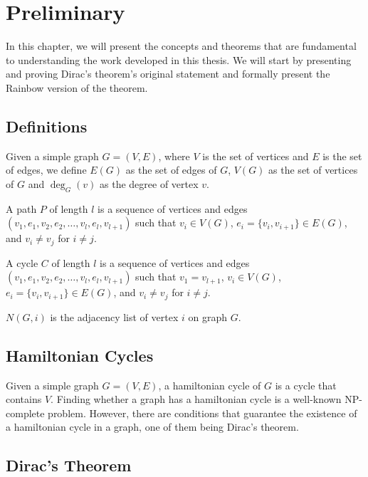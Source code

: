
\chapter{Preliminary}

In this chapter, we will present the concepts and theorems that are fundamental to understanding the 
work developed in this thesis. We will start by presenting and proving Dirac's theorem's original
statement and formally present the Rainbow version of the theorem.

\section{Definitions}

Given a simple graph $G = (V, E)$, where $V$ is the set of vertices and $E$ is the set of edges, we define $E(G)$ as
the set of edges of $G$, $V(G)$ as the set of vertices of $G$ and $\deg_G(v)$ as the degree of vertex $v$.

A path $P$ of length $l$ is a sequence of vertices and edges $(v_1, e_1, v_2, e_2, \ldots, v_{l}, e_{l}, v_{l + 1})$ such that
$v_i \in V(G)$, $e_i = \{v_i, v_{i + 1}\} \in E(G)$, and $v_i \neq v_j$ for $i \neq j$.

A cycle $C$ of length $l$ is a sequence of vertices and edges $(v_1, e_1, v_2, e_2, \ldots, v_{l}, e_{l}, v_{l + 1})$ such that
$v_{1} = v_{l + 1}$, $v_i \in V(G)$, $e_i = \{v_i, v_{i + 1}\} \in E(G)$, and $v_i \neq v_j$ for $i \neq j$.

$N(G, i)$ is the adjacency list of vertex $i$ on graph $G$.

\section{Hamiltonian Cycles}

Given a simple graph $G = (V, E)$, a hamiltonian cycle of $G$ is a cycle that contains $V$.
Finding whether a graph has a hamiltonian cycle is a well-known NP-complete problem. 
However, there are conditions that guarantee the existence of a hamiltonian cycle in a graph, one of them being Dirac's theorem.

\section{Dirac's Theorem}

